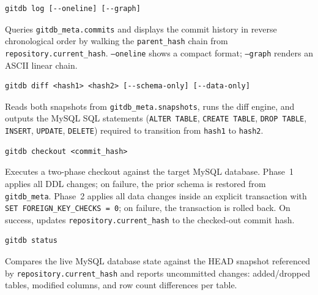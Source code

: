 \documentclass[12pt, a4paper]{article}
\begin{document}
\begin{tcolorbox}[commandbox, title=\texttt{gitdb log}]
\begin{lstlisting}
gitdb log [--oneline] [--graph]
\end{lstlisting}
\textcolor{codetext}{\small Queries \texttt{gitdb\_meta.commits} and displays the
commit history in reverse chronological order by walking the \texttt{parent\_hash}
chain from \texttt{repository.current\_hash}. \texttt{--oneline} shows a compact
format; \texttt{--graph} renders an ASCII linear chain.}
\end{tcolorbox}

\begin{tcolorbox}[commandbox, title=\texttt{gitdb diff}]
\begin{lstlisting}
gitdb diff <hash1> <hash2> [--schema-only] [--data-only]
\end{lstlisting}
\textcolor{codetext}{\small Reads both snapshots from \texttt{gitdb\_meta.snapshots},
runs the diff engine, and outputs the MySQL SQL statements (\texttt{ALTER TABLE},
\texttt{CREATE TABLE}, \texttt{DROP TABLE}, \texttt{INSERT}, \texttt{UPDATE},
\texttt{DELETE}) required to transition from \texttt{hash1} to \texttt{hash2}.}
\end{tcolorbox}

\begin{tcolorbox}[commandbox, title=\texttt{gitdb checkout}]
\begin{lstlisting}
gitdb checkout <commit_hash>
\end{lstlisting}
\textcolor{codetext}{\small Executes a two-phase checkout against the target MySQL
database. Phase~1 applies all DDL changes; on failure, the prior schema is
restored from \texttt{gitdb\_meta}. Phase~2 applies all data changes inside an
explicit transaction with \texttt{SET FOREIGN\_KEY\_CHECKS = 0}; on failure, the
transaction is rolled back. On success, updates
\texttt{repository.current\_hash} to the checked-out commit hash.}
\end{tcolorbox}

\begin{tcolorbox}[commandbox, title=\texttt{gitdb status}]
\begin{lstlisting}
gitdb status
\end{lstlisting}
\textcolor{codetext}{\small Compares the live MySQL database state against the
HEAD snapshot referenced by \texttt{repository.current\_hash} and reports
uncommitted changes: added/dropped tables, modified columns, and row count
differences per table.}
\end{tcolorbox}
\end{document}
